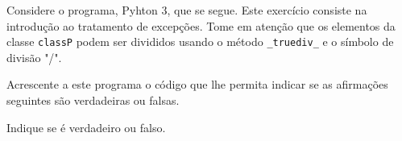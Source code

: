 \documentclass[12pt,varwidth=16cm,border=1pt]{standalone}
\begin{document}
Considere o programa, Pyhton 3, que se segue. Este exercício consiste na introdução ao tratamento de excepções. Tome em atenção que os elementos da classe \verb+classP+ podem ser divididos usando o método \verb+_truediv_+ e o símbolo de divisão "/".



Acrescente a este programa o código que lhe permita indicar se as
afirmações seguintes são verdadeiras ou falsas.

Indique se é verdadeiro ou falso.
\end{document}
